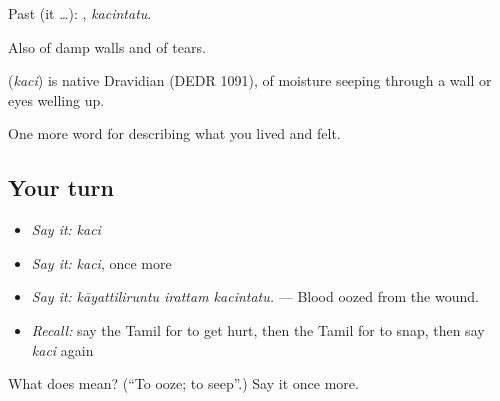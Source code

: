 Past (it …): , \emph{kacintatu}.

Also of damp walls and of tears.

\begin{cousinweb}
\textbf{} (\emph{kaci}) is native Dravidian (DEDR 1091), of moisture seeping through a wall or eyes welling up.
\end{cousinweb}

\begin{grammarlens}[title={What you've built}]
One more word for describing what you lived and felt.
\end{grammarlens}

\subsection*{Your turn}
\begin{itemize}
\raggedright
  \item \emph{Say it:} \emph{kaci}
  \item \emph{Say it:} \emph{kaci}, once more
  \item \emph{Say it:} \emph{kāyattiliruntu irattam kacintatu.} — Blood oozed from the wound.
  \item \emph{Recall:} say the Tamil for to get hurt, then the Tamil for to snap, then say \emph{kaci} again
\end{itemize}

\begin{tcolorbox}[breakable,colback=teal!4,colframe=teal!35!black,title={Before you move on}]
What does  mean? (\textquotedblleft{}To ooze; to seep\textquotedblright{}.) Say it once more.
\end{tcolorbox}
